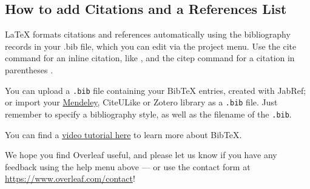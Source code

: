 \documentclass[fleqn,10pt]{olplainarticle}
\begin{document}
\subsection*{How to add Citations and a References List}

LaTeX formats citations and references automatically using the bibliography records in your .bib file, which you can edit via the project menu. Use the cite command for an inline citation, like \cite{greenwade93}, and the citep command for a citation in parentheses \citep{lees2010theoretical}.

You can upload a \verb|.bib| file containing your BibTeX entries, created with JabRef; or import your \href{https://www.overleaf.com/blog/184}{Mendeley}, CiteULike or Zotero library as a \verb|.bib| file. Just remember to specify a bibliography style, as well as the filename of the \verb|.bib|.

You can find a \href{https://www.overleaf.com/help/97-how-to-include-a-bibliography-using-bibtex}{video tutorial here} to learn more about BibTeX.

We hope you find Overleaf useful, and please let us know if you have any feedback using the help menu above --- or use the contact form at \url{https://www.overleaf.com/contact}!


\end{document}
